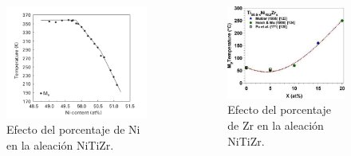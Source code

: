 \documentclass[11pt]{beamer}
\begin{document}
			\begin{frame}
				\begin{columns}
					\begin{column}{.49\textwidth}
						\begin{figure}
							\includegraphics[scale=0.2]{img/MsNiDependence.png}
							\caption*{Efecto del porcentaje de Ni en la aleación NiTiZr.}
						\end{figure}
					\end{column}
					\begin{column}{.49\textwidth}
						\begin{figure}
							\includegraphics[scale=0.2]{img/MsZrDependence.jpeg}
							\caption*{Efecto del porcentaje de Zr en la aleación NiTiZr.}				
						\end{figure}
					\end{column}
				\end{columns}
			\end{frame}
			
\end{document}
